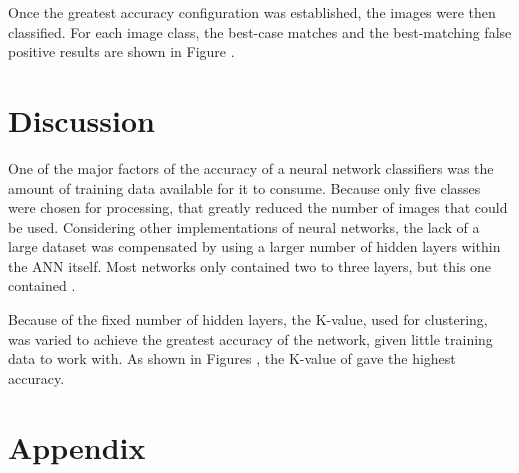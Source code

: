 \documentclass{article}
\begin{document}
Once the greatest accuracy configuration was established, the images were then classified. For each image class, the best-case matches and the best-matching false positive results are shown in Figure .

%


%
\section{Discussion}
\label{sec:discussion}
One of the major factors of the accuracy of a neural network classifiers was the amount of training data available for it to consume. Because only five classes were chosen for processing, that greatly reduced the number of images that could be used. Considering other implementations of neural networks, the lack of a large dataset was compensated by using a larger number of hidden layers within the ANN itself. Most networks only contained two to three layers, but this one contained .

Because of the fixed number of hidden layers, the K-value, used for clustering, was varied to achieve the greatest accuracy of the network, given little training data to work with. As shown in Figures , the K-value of  gave the highest accuracy. 


\section{Appendix}
\label{sec:appendix}

%
%
\end{document}
